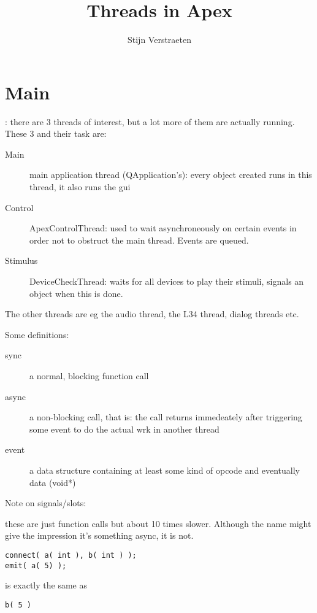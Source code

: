 \documentclass[a4paper,12pt]{article}
\title{Threads in Apex}
\author{Stijn Verstraeten}
\begin{document}
\maketitle

\tableofcontents

\section{Main}
:
there are 3 threads of interest, but a lot more of them are actually 
running. 
These 3 and their task are:

\begin{description}
\item[Main] main application thread (QApplication's): every object created runs in 
this thread,
  it also runs the gui
\item[Control] ApexControlThread: used to wait asynchroneously on certain events in 
order not to 
  obstruct the main thread. Events are queued.
\item[Stimulus] DeviceCheckThread: waits for all devices to play their stimuli, 
signals an object
  when this is done.
\end{description}

The other threads are eg the audio thread, the L34 thread, dialog threads etc.

Some definitions:
\begin{description}
\item[sync] a normal, blocking function call
\item[async] a non-blocking call, that is: the call returns immedeately after 
triggering some event 
         to do the actual wrk in another thread
\item[event] a data structure containing at least some kind of opcode and eventually 
data (void*)         
\end{description}

Note on signals/slots: 

these are just function calls but about 10 times slower. Although the name
might give the impression it's something async, it is not.

\begin{verbatim}
connect( a( int ), b( int ) ); 
emit( a( 5) );
\end{verbatim}


is exactly the same as 

\begin{verbatim}
b( 5 )
\end{verbatim}
\end{document}
